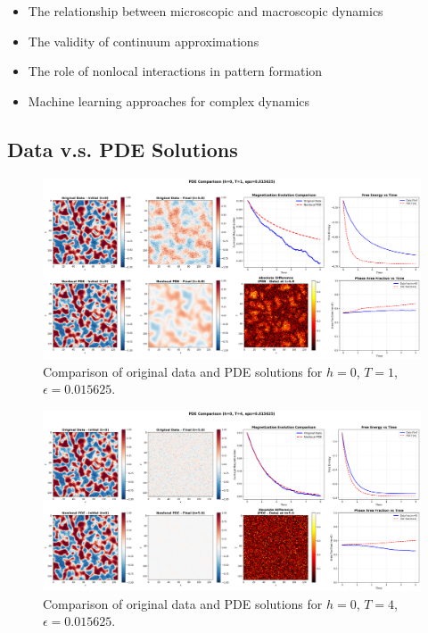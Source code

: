 \documentclass[11pt,a4paper]{article}
\begin{document}
\begin{itemize}
    \item The relationship between microscopic and macroscopic dynamics
    \item The validity of continuum approximations
    \item The role of nonlocal interactions in pattern formation
    \item Machine learning approaches for complex dynamics
\end{itemize}

\subsection{Data v.s. PDE Solutions}


\begin{figure}[!h]
    \centering
    \includegraphics[width=1.0\textwidth]{fig/pde_comparison_h0_T1_eps0.015625.png}
    \caption{Comparison of original data and PDE solutions for $h=0$, $T=1$, $\epsilon=0.015625$.}
\end{figure}


\begin{figure}[!h]
    \centering
    \includegraphics[width=1.0\textwidth]{fig/pde_comparison_h0_T4_eps0.015625.png}
    \caption{Comparison of original data and PDE solutions for $h=0$, $T=4$, $\epsilon=0.015625$.}
\end{figure}
\end{document}
